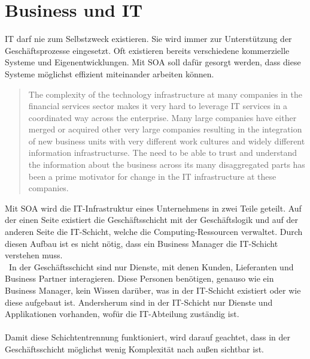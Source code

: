 \section{Business und IT}
\label{sec:BusinessAndIT}
IT darf nie zum Selbstzweck existieren. Sie wird immer zur Unterstützung der Geschäftsprozesse eingesetzt. Oft existieren bereits verschiedene kommerzielle Systeme und Eigenentwicklungen. Mit SOA soll dafür gesorgt werden, dass diese Systeme möglichst effizient miteinander arbeiten können.
\begin{quotation}
    \frqq The complexity of the technology infrastructure at many companies in the financial services sector makes it very hard to leverage IT services in a coordinated way across the enterprise. Many large companies have either merged or acquired other very large companies resulting in the integration of new business units with very different work cultures and widely different information infrastructurse. The need to be able to trust and understand the information about the business across its many disaggregated parts has been a prime motivator for change in the IT infrastructure at these companies.\flqq \cite[S. 17]{SOAForDummies}
\end{quotation}

Mit SOA wird die IT-Infrastruktur eines Unternehmens in zwei Teile geteilt. Auf der einen Seite existiert die Geschäftsschicht mit der Geschäftslogik und auf der anderen Seite die IT-Schicht, welche die Computing-Ressourcen verwaltet. Durch diesen Aufbau ist es nicht nötig, dass ein Business Manager die IT-Schicht verstehen muss.
\\\
In der Geschäftsschicht sind nur Dienste, mit denen Kunden, Lieferanten und Business Partner interagieren. Diese Personen benötigen, genauso wie ein Business Manager, kein Wissen darüber, was in der IT-Schicht existiert oder wie diese aufgebaut ist. Andersherum sind in der IT-Schicht nur Dienste und Applikationen vorhanden, wofür die IT-Abteilung zuständig ist.
\\\\
Damit diese Schichtentrennung funktioniert, wird darauf geachtet, dass in der Geschäftsschicht möglichst wenig Komplexität nach außen sichtbar ist.

